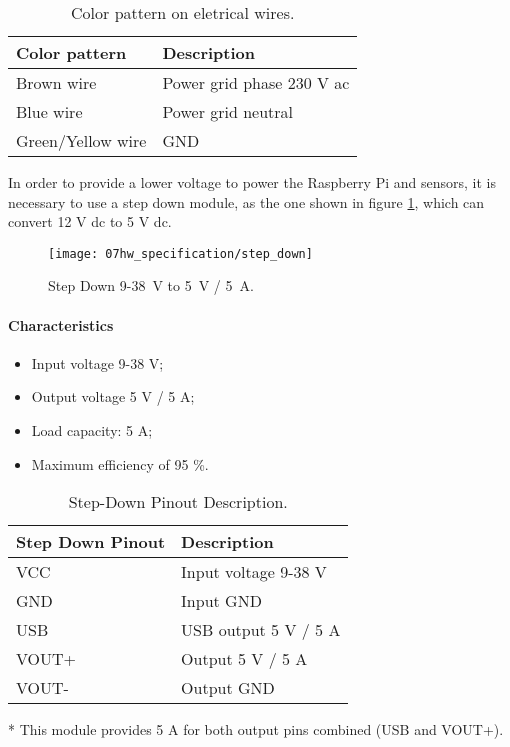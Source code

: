 \begin{table}[H]
	\centering
	\begin{tabular}{|m{5cm}|m{6cm}|}
		\hline
		\textbf{Color pattern} & \textbf{Description}
		\\\hline\hline
		
		Brown wire & Power grid phase 230 V \ac{ac}
		\\\hline
		Blue wire & Power grid neutral
		\\\hline
		Green/Yellow wire & GND
		\\\hline
	\end{tabular}
	\caption{Color pattern on eletrical wires.}
	\label{table:color_pattern_wire}
\end{table}

In order to provide a lower voltage to power the Raspberry Pi and sensors, it is necessary to use a step down module, as the one shown in figure \ref{fig:step_down}, which can convert 12 V \ac{dc} to 5 V \ac{dc}. \cite{step_down}
 
\begin{figure}[H]
	\centering
	\texttt{[image: 07hw\_specification/step\_down]}
	\caption{Step Down 9-38~V to 5~V / 5~A.}
	\label{fig:step_down}
\end{figure}

\paragraph*{Characteristics}
\begin{itemize}
	\item Input voltage 9-38 V;
	\item Output voltage 5 V / 5 A;
	\item Load capacity: 5 A;
	\item Maximum efficiency of 95 \%.
\end{itemize}

\begin{table}[H]
	\centering
	\begin{threeparttable}
	\begin{tabular}{|m{5cm}|m{6cm}|}
		\hline
		\textbf{Step Down Pinout} & \textbf{Description}
		\\\hline\hline
		
		VCC & Input voltage 9-38 V
		\\\hline
		GND & Input GND
		\\\hline
		USB & USB output 5 V / 5 A \tnote{*}
		\\\hline
		VOUT+ & Output 5 V / 5 A \tnote{*}
		\\\hline
		VOUT- & Output GND
		\\\hline
	\end{tabular}
	
	\begin{tablenotes}
		\small
		\item[*] This module provides 5 A for both output pins combined (USB and VOUT+).
	\end{tablenotes}
	\end{threeparttable}
	\caption{Step-Down Pinout Description.}
	\label{table:step_down_pinout}
\end{table}

